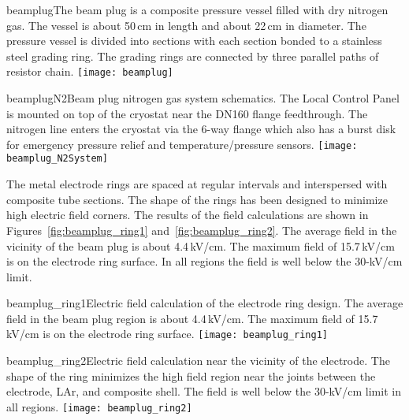 \begin{cdrfigure}{beamplug}{The beam plug is a  composite pressure vessel filled with dry nitrogen gas. The vessel is about 50\,cm in length and about 22\,cm in diameter. The pressure vessel is divided into sections with each section bonded to a stainless steel grading ring. The grading rings are connected by three parallel paths of resistor chain.}
  \texttt{[image: beamplug]}
\end{cdrfigure}


\begin{cdrfigure}{beamplugN2}{Beam plug nitrogen gas system schematics. The Local Control Panel is mounted on top of the cryostat near the DN160 flange feedthrough. The nitrogen line enters the cryostat via the 6-way flange which also has a burst disk for emergency pressure relief and temperature/pressure sensors.  }
  \texttt{[image: beamplug\_N2System]}
\end{cdrfigure}

The metal electrode rings are spaced at regular intervals and interspersed with composite tube sections. The shape of the rings has been designed to minimize high electric field corners. The results of the field calculations are shown in Figures~\ref{fig:beamplug_ring1} and~\ref{fig:beamplug_ring2}. The average field in the vicinity of the beam plug is about 4.4\,kV/cm. The maximum field of 15.7\,kV/cm is on the electrode ring surface. In all regions the field is well below the 30-kV/cm limit.

\begin{cdrfigure}{beamplug_ring1}{Electric field calculation of the electrode ring design. The average field in the beam plug region is about 4.4\,kV/cm. The maximum field of 15.7\,kV/cm is on the electrode ring surface. }
  \texttt{[image: beamplug\_ring1]}
\end{cdrfigure}

\begin{cdrfigure}{beamplug_ring2}{Electric field calculation near the vicinity of the electrode. The shape of the ring minimizes the high field region near the joints between the electrode, LAr, and composite shell. The field is well below the 30-kV/cm limit in all regions.}
  \texttt{[image: beamplug\_ring2]}
\end{cdrfigure}

